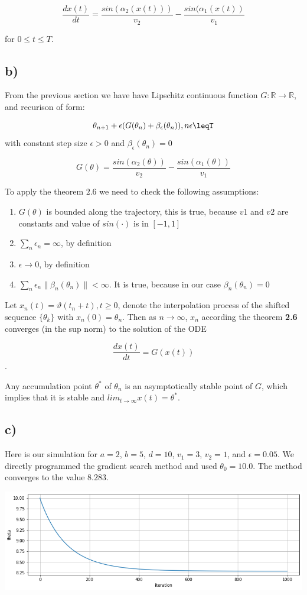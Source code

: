 \documentclass{article}
\begin{document}
$$ \frac{dx(t)}{dt}=\frac{sin(\alpha_{2}(x(t)))}{v_{2}} - \frac{sin(\alpha_{1}(x(t))}{v_{1}}$$

for $0 \leq t \leq T$.

\subsection{b)}

From the previous section we have have Lipschitz continuous function $G:\mathbb{R}\rightarrow\mathbb{R}$, and recurison of form:

$$\theta_{n+1}+\epsilon(G(\theta_{n}) + \beta_{\epsilon}(\theta_n)), n\epsilon\leqT$$
with constant step size $\epsilon > 0$ and $\beta_{\epsilon}(\theta_{n})=0$

$$G(\theta) = \frac{sin(\alpha_{2}(\theta))}{v_{2}} - \frac{sin(\alpha_{1}(\theta))}{v_{1}}$$

To apply the theorem $2.6$ we need to check the following assumptions:

\begin{enumerate}
    \item $G(\theta)$ is bounded along the trajectory, this is true, because $v1$ and $v2$ are constants and value of $sin(\cdot)$ is in $[-1, 1]$
    \item $\sum_{n}\epsilon_{n}=\infty$, by definition
    \item $\epsilon\rightarrow 0$, by definition
    \item $\sum_{n}\epsilon_{n}\lVert \beta_{n}(\theta_{n})\rVert < \infty$. It is true, because in our case $\beta_{n}(\theta_{n})=0$
\end{enumerate}

Let $x_n(t)=\vartheta(t_{n}+t), t\geq 0$, denote the interpolation process of the shifted sequence $\{\theta_{k}\}$ with $x_{n}(0)=\theta_{n}$. Then as $n\rightarrow\infty$, $x_{n}$ according the theorem \textbf{2.6} converges (in the sup norm) to the solution of the ODE

$$\frac{dx(t)}{dt}=G(x(t))$$. 

Any accumulation point $\theta^{*}$ of $\theta_{n}$ is an asymptotically stable point of $G$, which implies that it is stable and $lim_{t\rightarrow\infty}x(t)=\theta^{*}$.

\subsection{c)}

Here is our simulation for $a=2$, $b=5$, $d=10$, $v_{1}=3$, $v_{2}=1$, and $\epsilon=0.05$. We directly programmed the gradient search method and used $\theta_{0}=10.0$. The method converges to the value $8.283$.

\includegraphics[width=0.9\linewidth]{index.png}
\end{document}
